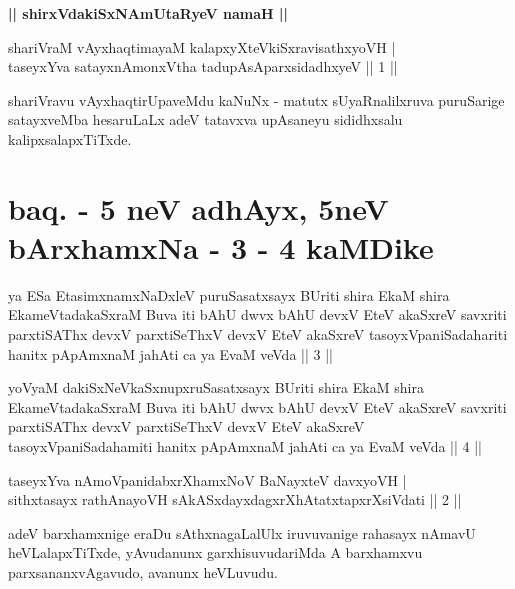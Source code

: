 \begin{center}
{\bf || shirxVdakiSxNAmUtaRyeV namaH ||}
\end{center}


\begin{shl}
shariVraM vAyxhaqtimayaM kalapxyXteV\s kiSxravisathxyoVH | \\
taseyxYva satayxnAmonxV\s tha tadupAsAparxsidadhxyeV \hfill ||  1 || 
\end{shl}

\begin{artha}
shariVravu vAyxhaqtirUpaveMdu kaNuNx - matutx sUyaRnalilxruva puruSarige satayxveMba hesaruLaLx adeV tatavxva upAsaneyu sididhxsalu kalipxsalapxTiTxde.
\end{artha}

\section*{baq. - 5 neV adhAyx, 5neV bArxhamxNa - 3 - 4 kaMDike}

\begin{shl}
ya ESa EtasimxnamxNaDxleV puruSasatxsayx BUriti shira EkaM shira EkameVtadakaSxraM Buva iti bAhU dwvx bAhU devxV EteV akaSxreV savxriti parxtiSAThx devxV parxtiSeThxV devxV EteV akaSxreV tasoyxVpaniSadahariti hanitx pApAmxnaM ja{\null}hAti ca ya EvaM veVda || 3 ||
\end{shl}
\begin{shl}
yoV\s yaM dakiSxNeV\s kaSxnupxruSasatxsayx BUriti shira EkaM shira EkameVtadakaSxraM Buva iti bAhU dwvx bAhU devxV EteV akaSxreV savxriti parxtiSAThx devxV parxtiSeThxV devxV EteV akaSxreV tasoyxVpaniSadahamiti hanitx pApAmxnaM ja{\null}hAti ca ya EvaM veVda || 4 ||
\end{shl}


\begin{shl}
taseyxYva nAmoVpanidabxrXhamxNoV BaNayxteV davxyoVH | \\
sithxtasayx rathAnayoVH sAkASxdayxdagxrXhAtatxtapxrXsiVdati \hfill ||  2 || 
\end{shl}

\begin{artha}
adeV barxhamxnige eraDu sAthxnagaLalUlx iruvuvanige rahasayx nAmavU heVLalapxTiTxde, yAvudanunx garxhisuvudariMda A barxhamxvu parxsananxvAgavudo, avanunx heVLuvudu.
\end{artha}

